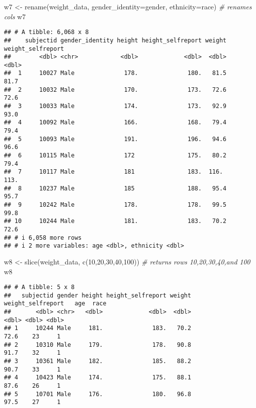 \documentclass[
]{article}
\newenvironment{Shaded}{\begin{snugshade}}{\end{snugshade}}
\newcommand{\AttributeTok}[1]{\textcolor[rgb]{0.77,0.63,0.00}{#1}}
\newcommand{\CommentTok}[1]{\textcolor[rgb]{0.56,0.35,0.01}{\textit{#1}}}
\newcommand{\DecValTok}[1]{\textcolor[rgb]{0.00,0.00,0.81}{#1}}
\newcommand{\FunctionTok}[1]{\textcolor[rgb]{0.00,0.00,0.00}{#1}}
\newcommand{\NormalTok}[1]{#1}
\newcommand{\OtherTok}[1]{\textcolor[rgb]{0.56,0.35,0.01}{#1}}
\begin{document}
\begin{Shaded}
\begin{Highlighting}[]
\NormalTok{w7 }\OtherTok{\textless{}{-}} \FunctionTok{rename}\NormalTok{(weight\_data, }\AttributeTok{gender\_identity=}\NormalTok{gender, }\AttributeTok{ethnicity=}\NormalTok{race) }\CommentTok{\# renames cols}
\NormalTok{w7}
\end{Highlighting}
\end{Shaded}

\begin{verbatim}
## # A tibble: 6,068 x 8
##    subjectid gender_identity height height_selfreport weight weight_selfreport
##        <dbl> <chr>            <dbl>             <dbl>  <dbl>             <dbl>
##  1     10027 Male              178.              180.   81.5              81.7
##  2     10032 Male              170.              173.   72.6              72.6
##  3     10033 Male              174.              173.   92.9              93.0
##  4     10092 Male              166.              168.   79.4              79.4
##  5     10093 Male              191.              196.   94.6              96.6
##  6     10115 Male              172               175.   80.2              79.4
##  7     10117 Male              181               183.  116.              113. 
##  8     10237 Male              185               188.   95.4              95.7
##  9     10242 Male              178.              178.   99.5              99.8
## 10     10244 Male              181.              183.   70.2              72.6
## # i 6,058 more rows
## # i 2 more variables: age <dbl>, ethnicity <dbl>
\end{verbatim}

\begin{Shaded}
\begin{Highlighting}[]
\NormalTok{w8 }\OtherTok{\textless{}{-}} \FunctionTok{slice}\NormalTok{(weight\_data, }\FunctionTok{c}\NormalTok{(}\DecValTok{10}\NormalTok{,}\DecValTok{20}\NormalTok{,}\DecValTok{30}\NormalTok{,}\DecValTok{40}\NormalTok{,}\DecValTok{100}\NormalTok{)) }\CommentTok{\# returns rows 10,20,30,40,and 100}
\NormalTok{w8}
\end{Highlighting}
\end{Shaded}

\begin{verbatim}
## # A tibble: 5 x 8
##   subjectid gender height height_selfreport weight weight_selfreport   age  race
##       <dbl> <chr>   <dbl>             <dbl>  <dbl>             <dbl> <dbl> <dbl>
## 1     10244 Male     181.              183.   70.2              72.6    23     1
## 2     10310 Male     179.              178.   90.8              91.7    32     1
## 3     10361 Male     182.              185.   88.2              90.7    33     1
## 4     10423 Male     174.              175.   88.1              87.6    26     1
## 5     10701 Male     176.              180.   96.8              97.5    27     1
\end{verbatim}
\end{document}
